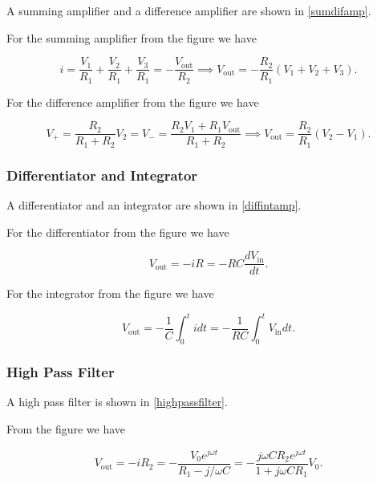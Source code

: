 \documentclass[english,a4paper,12pt]{report}
\begin{document}
A summing amplifier and a difference amplifier are shown in \cref{sumdifamp}.

For the summing amplifier from the figure we have 

\begin{equation}
    i = \frac{V_1 }{R_1 } + \frac{V_2 }{R_1 } + \frac{V_3 }{R_1 } = -\frac{V_{\text{out} } }{R_2 } \implies V_{\text{out} } = -\frac{R_2 }{R_1 } (V_1 +V_2 +V_3 ).    
\end{equation}

For the difference amplifier from the figure we have 

\begin{equation}
    V_{+} = \frac{R_2 }{R_1 +R_2 }V_2 = V_{-} = \frac{R_2 V_1 +R_1 V_{\text{out} } }{R_1 +R_2 } \implies V_{\text{out} } = \frac{R_2 }{R_1 }(V_2 -V_1 ).     
\end{equation}


\subsubsection{Differentiator and Integrator}

A differentiator and an integrator are shown in \cref{diffintamp}.

For the differentiator from the figure we have

\begin{equation}
    V_{\text{out} } = -iR = -RC \frac{dV_{\text{in} } }{dt}. 
\end{equation}

For the integrator from the figure we have

\begin{equation}
    V_{\text{out} } = -\frac{1}{C} \int_{0}^{t} idt = -\frac{1}{RC} \int_{0}^{t} V_{\text{in} }dt.    
\end{equation}


\subsubsection{High Pass Filter}

A high pass filter is shown in \cref{highpassfilter}.

From the figure we have 

\begin{equation}
    V_{\text{out} } = -iR_2 = -\frac{V_0 e^{j \omega t} }{R_1 -j /\omega C} = -\frac{j \omega C R_2 e^{j \omega t} }{1+j \omega CR_1 } V_0.  
\end{equation}
\end{document}

